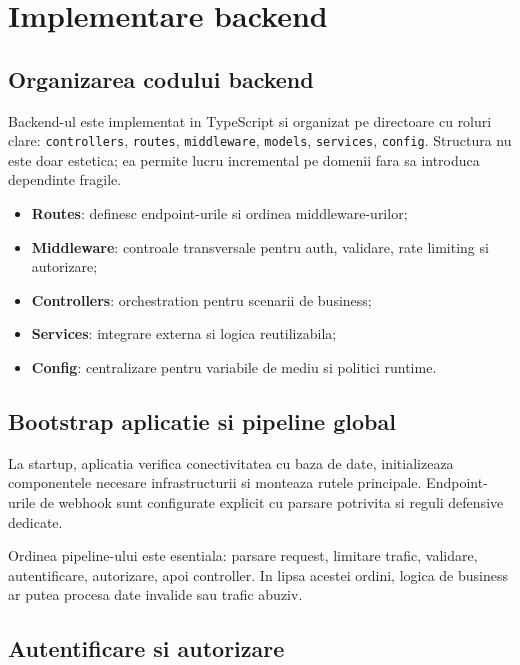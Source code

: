\chapter{Implementare backend}

\section{Organizarea codului backend}

Backend-ul este implementat in TypeScript si organizat pe directoare cu roluri clare: \texttt{controllers}, \texttt{routes}, \texttt{middleware}, \texttt{models}, \texttt{services}, \texttt{config}. Structura nu este doar estetica; ea permite lucru incremental pe domenii fara sa introduca dependinte fragile.

\begin{itemize}[leftmargin=1.2cm]
    \item \textbf{Routes}: definesc endpoint-urile si ordinea middleware-urilor;
    \item \textbf{Middleware}: controale transversale pentru auth, validare, rate limiting si autorizare;
    \item \textbf{Controllers}: orchestration pentru scenarii de business;
    \item \textbf{Services}: integrare externa si logica reutilizabila;
    \item \textbf{Config}: centralizare pentru variabile de mediu si politici runtime.
\end{itemize}

\section{Bootstrap aplicatie si pipeline global}

La startup, aplicatia verifica conectivitatea cu baza de date, initializeaza componentele necesare infrastructurii si monteaza rutele principale. Endpoint-urile de webhook sunt configurate explicit cu parsare potrivita si reguli defensive dedicate.

Ordinea pipeline-ului este esentiala: parsare request, limitare trafic, validare, autentificare, autorizare, apoi controller. In lipsa acestei ordini, logica de business ar putea procesa date invalide sau trafic abuziv.

\section{Autentificare si autorizare}

